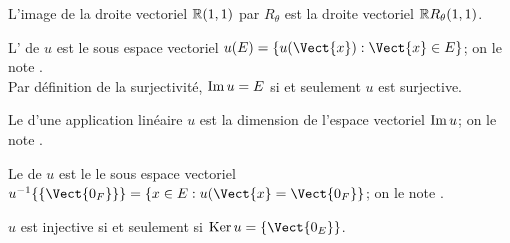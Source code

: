 \documentclass{book}
\begin{document}
\begin{Exemple}
L'image de la droite vectoriel $\mathbb{R} (1,1)$ par $R_\theta$ est la droite vectoriel $\mathbb{R} R_\theta(1,1)$.

\begin{center}
\begin{Figure}
\end{Figure}
\end{center}

\end{Exemple}
\begin{Definition}[Image]

L' de $u$ est le sous espace vectoriel $u(E) = \{u(\Vect{x}):\Vect{x}\in  E\}$;
  on le note .\\
Par définition de la surjectivité, $\operatorname{Im} u=E$ si et seulement $u$ est surjective. 
\end{Definition}
\begin{Definition}[Rang] Le  d'une  application linéaire $u$ est  la dimension de l'espace vectoriel $\operatorname{Im} u$;
  on le note .\\
\end{Definition}

\begin{Definition}[Noyau]
Le  de $u$ est le le sous espace vectoriel $u^{-1}\{ \{\Vect{0_F}\}\} = \{x\in  E:u(\Vect{x}=\Vect{0_F}\}$;
on le note .
\end{Definition}

\begin{Proposition}  
$u$ est injective si et seulement si $\Ker u = \{\Vect{0_E}\}$.
\end{Proposition}
\end{document}

